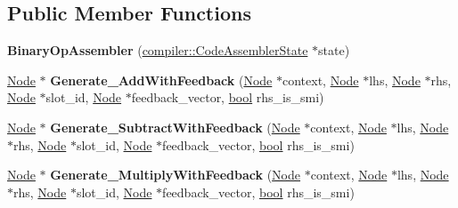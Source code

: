 \subsection*{Public Member Functions}
\begin{DoxyCompactItemize}
\item 
\mbox{\label{classv8_1_1internal_1_1BinaryOpAssembler_ac94e49d12ab0ee5bbd697b24fc226981}} 
{\bfseries Binary\+Op\+Assembler} (\mbox{\hyperlink{classv8_1_1internal_1_1compiler_1_1CodeAssemblerState}{compiler\+::\+Code\+Assembler\+State}} $\ast$state)
\item 
\mbox{\label{classv8_1_1internal_1_1BinaryOpAssembler_ae56299eca1f298ba2644420a3e324140}} 
\mbox{\hyperlink{classv8_1_1internal_1_1compiler_1_1Node}{Node}} $\ast$ {\bfseries Generate\+\_\+\+Add\+With\+Feedback} (\mbox{\hyperlink{classv8_1_1internal_1_1compiler_1_1Node}{Node}} $\ast$context, \mbox{\hyperlink{classv8_1_1internal_1_1compiler_1_1Node}{Node}} $\ast$lhs, \mbox{\hyperlink{classv8_1_1internal_1_1compiler_1_1Node}{Node}} $\ast$rhs, \mbox{\hyperlink{classv8_1_1internal_1_1compiler_1_1Node}{Node}} $\ast$slot\+\_\+id, \mbox{\hyperlink{classv8_1_1internal_1_1compiler_1_1Node}{Node}} $\ast$feedback\+\_\+vector, \mbox{\hyperlink{classbool}{bool}} rhs\+\_\+is\+\_\+smi)
\item 
\mbox{\label{classv8_1_1internal_1_1BinaryOpAssembler_a40c8c46b224ff0f5300deba5974a9ce2}} 
\mbox{\hyperlink{classv8_1_1internal_1_1compiler_1_1Node}{Node}} $\ast$ {\bfseries Generate\+\_\+\+Subtract\+With\+Feedback} (\mbox{\hyperlink{classv8_1_1internal_1_1compiler_1_1Node}{Node}} $\ast$context, \mbox{\hyperlink{classv8_1_1internal_1_1compiler_1_1Node}{Node}} $\ast$lhs, \mbox{\hyperlink{classv8_1_1internal_1_1compiler_1_1Node}{Node}} $\ast$rhs, \mbox{\hyperlink{classv8_1_1internal_1_1compiler_1_1Node}{Node}} $\ast$slot\+\_\+id, \mbox{\hyperlink{classv8_1_1internal_1_1compiler_1_1Node}{Node}} $\ast$feedback\+\_\+vector, \mbox{\hyperlink{classbool}{bool}} rhs\+\_\+is\+\_\+smi)
\item 
\mbox{\label{classv8_1_1internal_1_1BinaryOpAssembler_ac738ccf0b995a9e1551eea22e81e1c57}} 
\mbox{\hyperlink{classv8_1_1internal_1_1compiler_1_1Node}{Node}} $\ast$ {\bfseries Generate\+\_\+\+Multiply\+With\+Feedback} (\mbox{\hyperlink{classv8_1_1internal_1_1compiler_1_1Node}{Node}} $\ast$context, \mbox{\hyperlink{classv8_1_1internal_1_1compiler_1_1Node}{Node}} $\ast$lhs, \mbox{\hyperlink{classv8_1_1internal_1_1compiler_1_1Node}{Node}} $\ast$rhs, \mbox{\hyperlink{classv8_1_1internal_1_1compiler_1_1Node}{Node}} $\ast$slot\+\_\+id, \mbox{\hyperlink{classv8_1_1internal_1_1compiler_1_1Node}{Node}} $\ast$feedback\+\_\+vector, \mbox{\hyperlink{classbool}{bool}} rhs\+\_\+is\+\_\+smi)

\end{DoxyCompactItemize}
